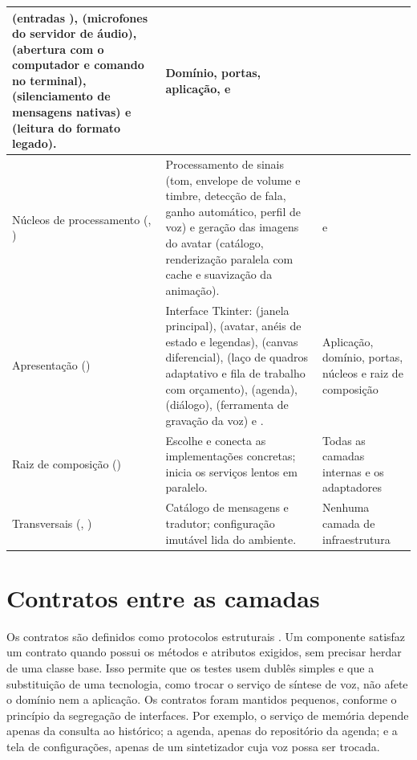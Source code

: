 \begin{singlespace}
\begin{tabularx}{\textwidth}{|P{3.0cm}|L|P{3.4cm}|}
(entradas ),  (microfones do servidor de áudio),
 (abertura com o computador e comando no terminal), 
(silenciamento de mensagens nativas) e 
(leitura do formato legado). & Domínio, portas, aplicação,  e  \\ \hline
Núcleos de processamento (, ) & Processamento de sinais (tom, envelope de
volume e timbre, detecção de fala, ganho automático, perfil de voz) e geração das imagens do avatar
(catálogo, renderização paralela com cache e suavização da animação). &  e  \\ \hline
Apresentação () & Interface Tkinter:  (janela principal), 
(avatar, anéis de estado e legendas),  (canvas diferencial),  (laço de quadros
adaptativo e fila de trabalho com orçamento),  (agenda),  (diálogo),
 (ferramenta de gravação da voz) e . & Aplicação, domínio, portas, núcleos e
raiz de composição \\ \hline
Raiz de composição () & Escolhe e conecta as implementações concretas; inicia os
serviços lentos em paralelo. & Todas as camadas internas e os adaptadores \\ \hline
Transversais (, ) & Catálogo de mensagens e tradutor; configuração
imutável lida do ambiente. & Nenhuma camada de infraestrutura \\ \hline
\end{tabularx}
\end{singlespace}

\section{Contratos entre as camadas}

Os contratos são definidos como protocolos estruturais \cite{pep544}. Um componente satisfaz um
contrato quando possui os métodos e atributos exigidos, sem precisar herdar de uma classe base. Isso
permite que os testes usem dublês simples \cite{meszaros2007} e que a substituição de uma tecnologia,
como trocar o serviço de síntese de voz, não afete o domínio nem a aplicação. Os contratos foram
mantidos pequenos, conforme o princípio da segregação de interfaces. Por exemplo, o serviço de memória
depende apenas da consulta ao histórico; a agenda, apenas do repositório da agenda; e a tela de
configurações, apenas de um sintetizador cuja voz possa ser trocada.

